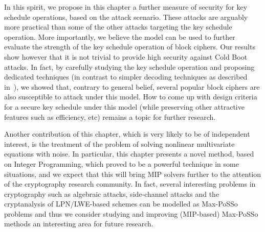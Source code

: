 In this spirit, we propose in this chapter a further measure of security for key schedule operations, based on the \coldboot attack scenario. These attacks are arguably more practical than some of the other attacks targeting the key schedule operation. More importantly, we believe the model can be used to further evaluate the strength of the key schedule operation of block ciphers. Our results show however that it is not trivial to provide high security against Cold Boot attacks. In fact, by carefully studying the key schedule operation and proposing dedicated techniques (in contrast to simpler decoding techniques as described in~\cite{coldboot08}), we showed that, contrary to general belief, several popular block ciphers are also susceptible to attack under this model. How to come up with design criteria for a secure key schedule under this model (while preserving
other attractive features such as efficiency, etc) remains a topic for further research.

Another contribution of this chapter, which is very likely to be of independent interest, is the treatment of the problem of solving nonlinear multivariate equations with noise. In particular, this chapter presents a novel method, based on Integer Programming, which proved to be a powerful technique in some situations, and we expect that this will bring MIP solvers further to the attention of the cryptography research community. In fact, several interesting problems in cryptography such as algebraic attacks, side-channel attacks and the crypt\-analysis of LPN/LWE-based schemes can be modelled as Max-PoSSo problems and thus we consider studying and improving (MIP-based) Max-PoSSo methods an interesting area for future research.

